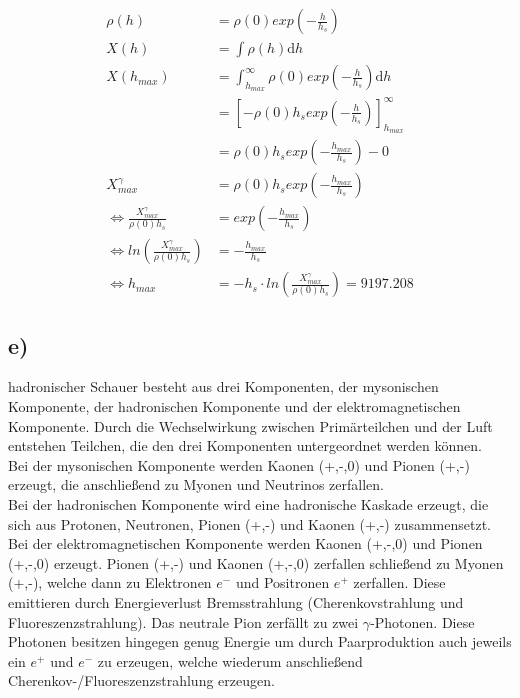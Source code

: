     \begin{align*}
        \rho(h) &= \rho(0) exp\left( -\frac{h}{h_s} \right)\\
        X(h) &= \int \rho(h) \mathrm{d}h\\
        X(h_{max}) &= \int_{h_{max}}^{\infty} \rho(0) exp\left( -\frac{h}{h_s} \right) \mathrm{d}h\\
        &= \left[  -\rho(0) h_s exp\left( -\frac{h}{h_s} \right) \right]_{h_{max}}^{\infty}\\
        &= \rho(0) h_s exp\left( -\frac{h_{max}}{h_s} \right) -0\\
        X_{max}^{\gamma} &= \rho(0) h_s exp\left( -\frac{h_{max}}{h_s} \right)\\
        \Leftrightarrow \frac{X_{max}^{\gamma}}{\rho(0) h_s} &= exp\left( -\frac{h_{max}}{h_s} \right)\\
        \Leftrightarrow ln\left( \frac{X_{max}^{\gamma}}{\rho(0) h_s} \right) &= -\frac{h_{max}}{h_s}\\
        \Leftrightarrow h_{max} &= -h_s \cdot ln\left( \frac{X_{max}^{\gamma}}{\rho(0) h_s} \right) = 9197.208
    \end{align*}

\subsection{e)}

    \justifying hadronischer Schauer besteht aus drei Komponenten, der mysonischen Komponente, der hadronischen Komponente und der elektromagnetischen Komponente. 
    Durch die Wechselwirkung zwischen Primärteilchen und der Luft entstehen Teilchen, die den drei Komponenten untergeordnet werden können.\\
    Bei der mysonischen Komponente werden Kaonen (+,-,0) und Pionen (+,-) erzeugt, die anschließend zu Myonen und Neutrinos zerfallen.\\
    Bei der hadronischen Komponente wird eine hadronische Kaskade erzeugt, die sich aus Protonen, Neutronen, Pionen (+,-) und Kaonen (+,-) zusammensetzt.\\
    Bei der elektromagnetischen Komponente werden Kaonen (+,-,0) und Pionen (+,-,0) erzeugt. Pionen (+,-) und Kaonen (+,-,0) zerfallen schließend zu Myonen (+,-), welche dann 
    zu Elektronen $e^-$ und Positronen $e^+$ zerfallen. Diese emittieren durch Energieverlust Bremsstrahlung (Cherenkovstrahlung und Fluoreszenzstrahlung). Das neutrale Pion 
    zerfällt zu zwei $\gamma$-Photonen. Diese Photonen besitzen hingegen genug Energie um durch Paarproduktion auch jeweils ein $e^+$ und $e^-$ zu erzeugen, welche wiederum
    anschließend Cherenkov-/Fluoreszenzstrahlung erzeugen. 

